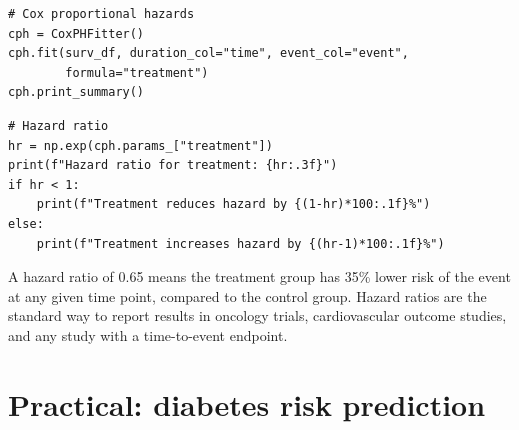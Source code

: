 \begin{verbatim}
# Cox proportional hazards
cph = CoxPHFitter()
cph.fit(surv_df, duration_col="time", event_col="event",
        formula="treatment")
cph.print_summary()
\end{verbatim}

\begin{verbatim}
# Hazard ratio
hr = np.exp(cph.params_["treatment"])
print(f"Hazard ratio for treatment: {hr:.3f}")
if hr < 1:
    print(f"Treatment reduces hazard by {(1-hr)*100:.1f}%")
else:
    print(f"Treatment increases hazard by {(hr-1)*100:.1f}%")
\end{verbatim}

\begin{clinicalnote}
A hazard ratio of 0.65 means the treatment group has 35\% lower risk of the event at any given time point, compared to the control group. Hazard ratios are the standard way to report results in oncology trials, cardiovascular outcome studies, and any study with a time-to-event endpoint.
\end{clinicalnote}

\section{Practical: diabetes risk prediction}

